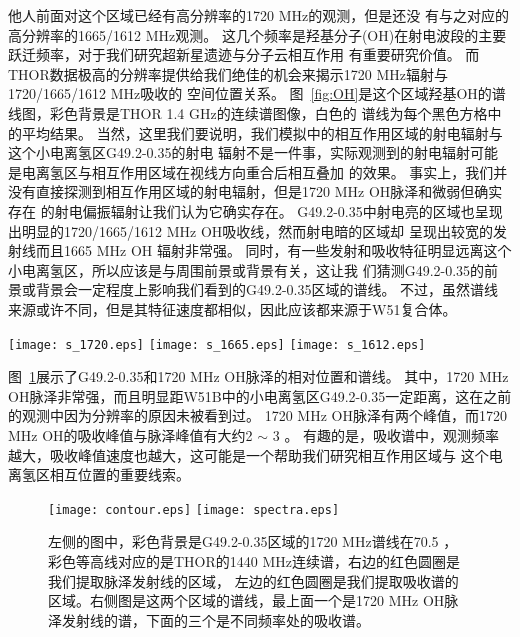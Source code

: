 他人前面对这个区域已经有高分辨率的1720 MHz的观测\citep{2005ASPC..340..334B}，但是还没
有与之对应的高分辨率的1665/1612 MHz观测。
这几个频率是羟基分子(OH)在射电波段的主要跃迁频率，对于我们研究超新星遗迹与分子云相互作用
有重要研究价值。
而THOR数据极高的分辨率提供给我们绝佳的机会来揭示1720 MHz辐射与 1720/1665/1612 MHz吸收的
空间位置关系。
图~\ref{fig:OH}是这个区域羟基OH的谱线图，彩色背景是THOR 1.4 GHz的连续谱图像，白色的
谱线为每个黑色方格中的平均结果。
当然，这里我们要说明，我们模拟中的相互作用区域的射电辐射与这个小电离氢区G49.2-0.35的射电
辐射不是一件事，实际观测到的射电辐射可能是电离氢区与相互作用区域在视线方向重合后相互叠加
的效果。
事实上，我们并没有直接探测到相互作用区域的射电辐射，但是1720 MHz OH脉泽和微弱但确实存在
的射电偏振辐射让我们认为它确实存在。
G49.2-0.35中射电亮的区域也呈现出明显的1720/1665/1612 MHz OH吸收线，然而射电暗的区域却
呈现出较宽的发射线而且1665 MHz OH 辐射非常强。
同时，有一些发射和吸收特征明显远离这个小电离氢区，所以应该是与周围前景或背景有关，这让我
们猜测G49.2-0.35的前景或背景会一定程度上影响我们看到的G49.2-0.35区域的谱线。
不过，虽然谱线来源或许不同，但是其特征速度都相似，因此应该都来源于W51复合体。

\begin{figure*}
   \centering
   \texttt{[image: s\_1720.eps]}
   \texttt{[image: s\_1665.eps]}
   \texttt{[image: s\_1612.eps]}
   \caption{三幅图分别展示了G49.2-0.35区域三个频率(1720/1665/1612 MHz)的OH谱线图。
   彩色背景是THOR数据的1440 MHz连续谱图像。谱线是每一个黑色方格区域中中-58.5 。第一幅图中，区域$49.16^{\circ}<l<49.19^{\circ}$,
   $-0.34^{\circ}<b<-0.31^{\circ}$中的标度与其它区域不同，因为这个区域里的1720 MHz OH
   脉泽非常强，如果使用相同标度其谱线就超出整个图形了，所以这个区域的谱线强度是除了20的。}
\label{fig:OH}
\end{figure*}

图~\ref{fig:spectra}展示了G49.2-0.35和1720 MHz OH脉泽的相对位置和谱线。
其中，1720 MHz OH脉泽非常强，而且明显距W51B中的小电离氢区G49.2-0.35一定距离，这在之前
的观测中因为分辨率的原因未被看到过。
1720 MHz OH脉泽有两个峰值，而1720 MHz OH的吸收峰值与脉泽峰值有大约2 $\sim$ 3 。
有趣的是，吸收谱中，观测频率越大，吸收峰值速度也越大，这可能是一个帮助我们研究相互作用区域与
这个电离氢区相互位置的重要线索。

\begin{figure}
   \centering
   \texttt{[image: contour.eps]}
   \texttt{[image: spectra.eps]}
   \caption{左侧的图中，彩色背景是G49.2-0.35区域的1720 MHz谱线在70.5 ，
   彩色等高线对应的是THOR的1440 MHz连续谱，右边的红色圆圈是我们提取脉泽发射线的区域，
   左边的红色圆圈是我们提取吸收谱的区域。右侧图是这两个区域的谱线，最上面一个是1720 MHz
   OH脉泽发射线的谱，下面的三个是不同频率处的吸收谱。}
  \label{fig:spectra}
\end{figure}

